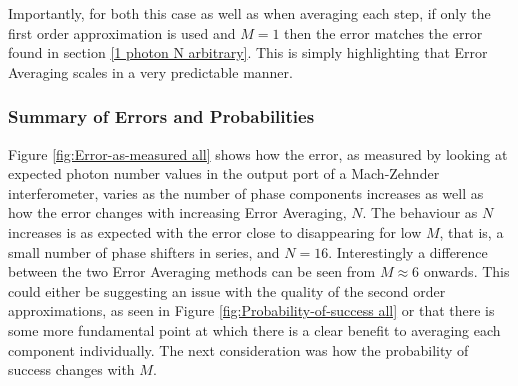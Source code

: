 \documentclass[aps,pra,twocolumn,superscriptaddress,numerical]{revtex4-1}
\begin{document}
		Importantly, for both this case as well as when averaging each step, if only the first order approximation is used and $M=1$ then the error matches the error found in section \ref{1 photon N arbitrary}. This is simply highlighting that Error Averaging scales in a very predictable manner.
		
		
		\subsubsection{Summary of Errors and Probabilities\label{Summary of Errors and Probabilities}}
		
		Figure \ref{fig:Error-as-measured all} shows how the error, as measured by looking at expected photon number values in the output port of a Mach-Zehnder interferometer, varies as the number of phase components increases as well as how the error changes with increasing Error Averaging, $N$. The behaviour as $N$ increases is as expected with the error close to disappearing for low $M$, that is, a small number of phase shifters in series, and $N=16$. Interestingly a difference between the two Error Averaging methods can be seen from $M\approx6$ onwards. This could either be suggesting an issue with the quality of the second order approximations, as seen in Figure \ref{fig:Probability-of-success all} or that there is some more fundamental point at which there is a clear benefit to averaging each component individually. The next consideration was how the probability of success changes with $M$.
		
\end{document}

